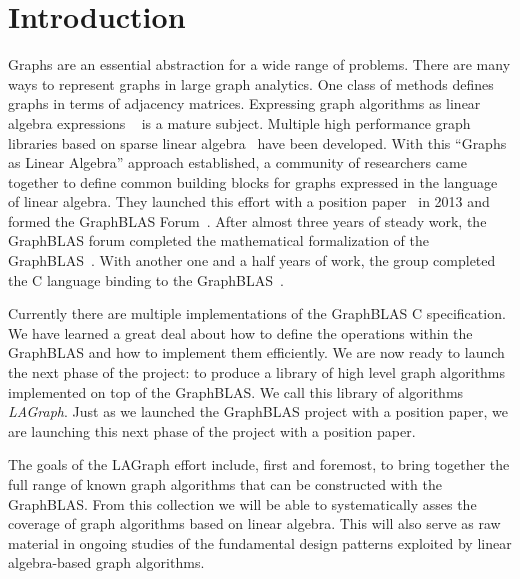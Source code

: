 \section{Introduction}
\label{sec:intro}



Graphs are an essential abstraction for a wide range of problems.  There are 
many ways to represent graphs in large graph analytics.  One class of methods defines
graphs in terms of adjacency matrices.
% 
Expressing graph algorithms as linear algebra expressions ~\cite{kepner2011graph}
is a mature subject.  Multiple 
high performance graph libraries based on sparse 
linear algebra~\cite{combblas,
gadepally2015graphulo, gpi2016, sundaram2015graphmat,che2016programming}
have been developed.   With this ``Graphs as Linear Algebra'' approach established, 
a community of researchers came together to define common building
blocks for graphs expressed in the language of linear algebra.  They launched
this effort with a position paper~\cite{hpec13} in 2013 and formed the GraphBLAS
Forum~\cite{graphblas_web}.  After almost three years of steady work,
the GraphBLAS forum completed the
mathematical formalization of the GraphBLAS~\cite{mathgraphblas16}. With another 
one and a half years of work, the group completed the C
language binding to the GraphBLAS~\cite{cspec}.

Currently there are multiple implementations of the GraphBLAS C specification.  
We have learned a great deal about how to define the operations within the GraphBLAS 
and how to implement them efficiently.  We are now ready to launch the next phase of the project:
to produce a library of high level graph algorithms implemented on top of the GraphBLAS.
We call this library of algorithms \emph{LAGraph}.
Just as we launched the GraphBLAS project with a position paper, we are launching 
this next phase of the project with a position paper.  

The goals of the LAGraph effort include, first and foremost, to bring together the full 
range of known graph algorithms that can be constructed with the GraphBLAS.
From this collection we will be able to systematically asses the coverage of 
graph algorithms based on linear algebra. This will also serve
as raw material in ongoing studies of the fundamental design patterns exploited 
by linear algebra-based graph algorithms. 

